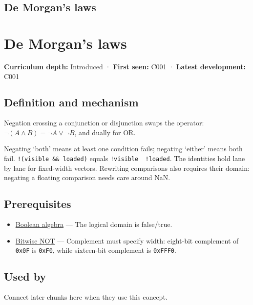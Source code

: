 \hypertarget{appendix-9079d3659da4}{}
\section*{De Morgan's laws}
\chapter{De Morgan's laws}\label{appendix-9079d3659da4-de-morgans-laws}

\textbf{Curriculum depth:} Introduced · \textbf{First seen:} C001 · \textbf{Latest development:} C001

\section{Definition and mechanism}\label{appendix-9079d3659da4-definition-and-mechanism}

Negation crossing a conjunction or disjunction swaps the operator: \(\neg(A\land B)=\neg A\lor\neg B\), and dually for OR.

Negating `both' means at least one condition fails; negating `either' means both fail. \texttt{!(visible\ \&\&\ loaded)} equals \texttt{!visible\ \textbar{}\textbar{}\ !loaded}. The identities hold lane by lane for fixed-width vectors. Rewriting comparisons also requires their domain: negating a floating comparison needs care around NaN.

\section{Prerequisites}\label{appendix-9079d3659da4-prerequisites}

\begin{itemize}
\tightlist
\item
  \hyperref[appendix-24475e1596a8]{Boolean algebra} --- The logical domain is false/true.
\item
  \hyperref[appendix-8f38927cfc54]{Bitwise NOT} --- Complement must specify width: eight-bit complement of \texttt{0x0F} is \texttt{0xF0}, while sixteen-bit complement is \texttt{0xFFF0}.
\end{itemize}

\section{Used by}\label{appendix-9079d3659da4-used-by}

Connect later chunks here when they use this concept.

